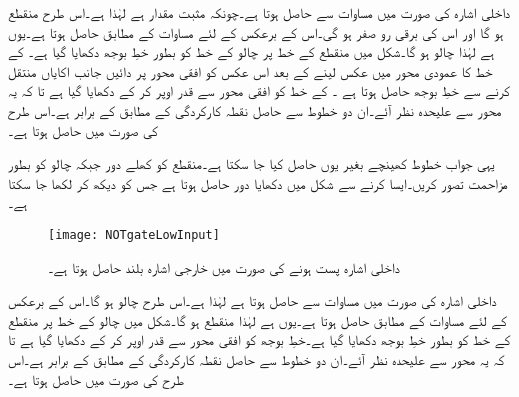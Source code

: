 داخلی اشارہ  کی صورت میں مساوات  سے  حاصل ہوتا ہے۔چونکہ  مثبت مقدار ہے  لہٰذا   ہے۔اس طرح   منقطع ہو گا اور اس کی برقی رو صفر ہو گی۔اس کے برعکس  کے لئے  مساوات  کے مطابق  حاصل ہوتا ہے۔یوں  ہے لہٰذا  چالو ہو گا۔شکل  میں منقطع  کے خط پر چالو  کے خط کو بطور خطِ بوجھ دکھایا گیا ہے۔ کے خط کا عمودی محور میں عکس لینے کے بعد اس عکس کو افقی محور پر دائیں جانب  اکایاں منتقل کرنے سے خطِ بوجھ حاصل ہوتا ہے ۔ کے خط کو افقی محور سے قدر اوپر کر کے دکھایا گیا ہے تا کہ یہ محور سے علیحدہ نظر آئے۔ان دو خطوط سے حاصل نقطہ کارکردگی کے مطابق  کے برابر ہے۔اس طرح  کی صورت میں  حاصل ہوتا ہے۔

یہی جواب خطوط کھینچے بغیر  یوں حاصل کیا جا سکتا ہے۔منقطع  کو کھلے دور جبکہ چالو  کو بطور مزاحمت تصور کریں۔ایسا کرنے سے شکل  میں دکھایا دور حاصل ہوتا ہے جس کو دیکھ کر   لکھا جا سکتا ہے۔ 

\begin{figure}
\centering
\texttt{[image: NOTgateLowInput]}
\caption{داخلی اشارہ پست ہونے کی صورت میں خارجی اشارہ بلند حاصل ہوتا ہے۔}
\label{شکل_ماسفیٹ_نفی_کار_داخلی_پست_خارجی_بلند}
\end{figure}

داخلی اشارہ  کی صورت میں مساوات  سے  حاصل ہوتا ہے لہٰذا   ہے۔اس طرح   چالو ہو گا۔اس کے برعکس  کے لئے  مساوات  کے مطابق  حاصل ہوتا ہے۔یوں  ہے لہٰذا  منقطع ہو گا۔شکل  میں چالو  کے خط پر منقطع  کے خط کو بطور خطِ بوجھ دکھایا گیا ہے۔خطِ بوجھ کو افقی محور سے قدر اوپر کر کے دکھایا گیا ہے تا کہ یہ محور سے علیحدہ نظر آئے۔ان دو خطوط سے حاصل نقطہ کارکردگی کے مطابق  کے برابر ہے۔اس طرح  کی صورت میں  حاصل ہوتا ہے۔

